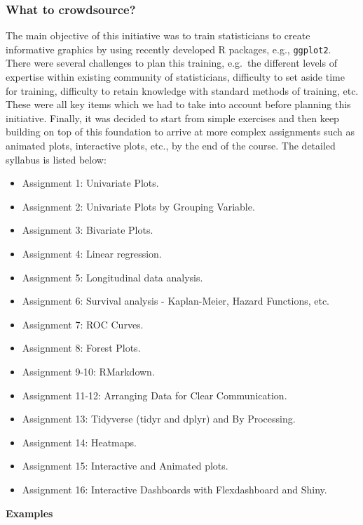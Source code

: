 \hypertarget{what-to-crowdsource}{%
\subsubsection{What to crowdsource?}\label{what-to-crowdsource}}

The main objective of this initiative was to train statisticians to
create informative graphics by using recently developed R packages,
e.g., \texttt{ggplot2}. There were several challenges to plan this
training, e.g.~the different levels of expertise within existing
community of statisticians, difficulty to set aside time for training,
difficulty to retain knowledge with standard methods of training, etc.
These were all key items which we had to take into account before
planning this initiative. Finally, it was decided to start from simple
exercises and then keep building on top of this foundation to arrive at
more complex assignments such as animated plots, interactive plots,
etc., by the end of the course. The detailed syllabus is listed below:

\begin{itemize}
\tightlist
\item
  Assignment 1: Univariate Plots.
\item
  Assignment 2: Univariate Plots by Grouping Variable.
\item
  Assignment 3: Bivariate Plots.
\item
  Assignment 4: Linear regression.
\item
  Assignment 5: Longitudinal data analysis.
\item
  Assignment 6: Survival analysis - Kaplan-Meier, Hazard Functions, etc.
\item
  Assignment 7: ROC Curves.
\item
  Assignment 8: Forest Plots.
\item
  Assignment 9-10: RMarkdown.
\item
  Assignment 11-12: Arranging Data for Clear Communication.
\item
  Assignment 13: Tidyverse (tidyr and dplyr) and By Processing.
\item
  Assignment 14: Heatmaps.
\item
  Assignment 15: Interactive and Animated plots.
\item
  Assignment 16: Interactive Dashboards with Flexdashboard and Shiny.
\end{itemize}

\noindent \textbf{Examples}

